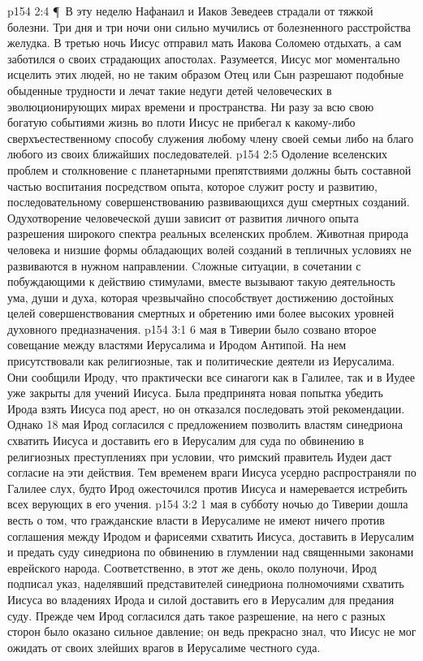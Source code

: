\vs p154 2:4 \P\ В эту неделю Нафанаил и Иаков Зеведеев страдали от тяжкой болезни. Три дня и три ночи они сильно мучились от болезненного расстройства желудка. В третью ночь Иисус отправил мать Иакова Соломею отдыхать, а сам заботился о своих страдающих апостолах. Разумеется, Иисус мог моментально исцелить этих людей, но не таким образом Отец или Сын разрешают подобные обыденные трудности и лечат такие недуги детей человеческих в эволюционирующих мирах времени и пространства. Ни разу за всю свою богатую событиями жизнь во плоти Иисус не прибегал к какому\hyp{}либо сверхъестественному способу служения любому члену своей семьи либо на благо любого из своих ближайших последователей.
\vs p154 2:5 Одоление вселенских проблем и столкновение с планетарными препятствиями должны быть составной частью воспитания посредством опыта, которое служит росту и развитию, последовательному совершенствованию развивающихся душ смертных созданий. Одухотворение человеческой души зависит от развития личного опыта разрешения широкого спектра реальных вселенских проблем. Животная природа человека и низшие формы обладающих волей созданий в тепличных условиях не развиваются в нужном направлении. Cложные ситуации, в сочетании с побуждающими к действию стимулами, вместе вызывают такую деятельность ума, души и духа, которая чрезвычайно способствует достижению достойных целей совершенствования смертных и обретению ими более высоких уровней духовного предназначения.
\vs p154 3:1 6 мая в Тиверии было созвано второе совещание между властями Иерусалима и Иродом Антипой. На нем присутствовали как религиозные, так и политические деятели из Иерусалима. Они сообщили Ироду, что практически все синагоги как в Галилее, так и в Иудее уже закрыты для учений Иисуса. Была предпринята новая попытка убедить Ирода взять Иисуса под арест, но он отказался последовать этой рекомендации. Однако 18 мая Ирод согласился с предложением позволить властям синедриона схватить Иисуса и доставить его в Иерусалим для суда по обвинению в религиозных преступлениях при условии, что римский правитель Иудеи даст согласие на эти действия. Тем временем враги Иисуса усердно распространяли по Галилее слух, будто Ирод ожесточился против Иисуса и намеревается истребить всех верующих в его учения.
\vs p154 3:2 1 мая в субботу ночью до Тиверии дошла весть о том, что гражданские власти в Иерусалиме не имеют ничего против соглашения между Иродом и фарисеями схватить Иисуса, доставить в Иерусалим и предать суду синедриона по обвинению в глумлении над священными законами еврейского народа. Соответственно, в этот же день, около полуночи, Ирод подписал указ, наделявший представителей синедриона полномочиями схватить Иисуса во владениях Ирода и силой доставить его в Иерусалим для предания суду. Прежде чем Ирод согласился дать такое разрешение, на него с разных сторон было оказано сильное давление; он ведь прекрасно знал, что Иисус не мог ожидать от своих злейших врагов в Иерусалиме честного суда.
